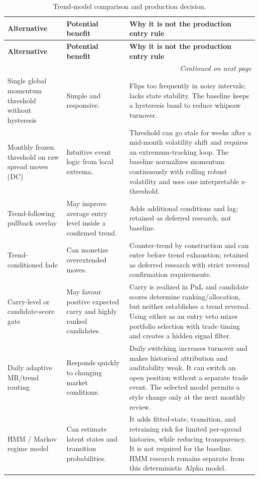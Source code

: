 {
\small
\setlength{\LTleft}{0pt}
\setlength{\LTright}{0pt}
\setlength{\tabcolsep}{5pt}
\renewcommand{\arraystretch}{1.15}
\begin{longtable}{p{} p{} p{}}
\caption{Trend-model comparison and production decision.}\label{tab:pairs-model-comparison-overleaf} \\
\toprule
\textbf{Alternative} & \textbf{Potential benefit} & \textbf{Why it is not the production entry rule} \\
\midrule
\endfirsthead
\toprule
\textbf{Alternative} & \textbf{Potential benefit} & \textbf{Why it is not the production entry rule} \\
\midrule
\endhead
\midrule
\multicolumn{3}{r}{\textit{Continued on next page}} \\
\midrule
\endfoot
\bottomrule
\endlastfoot
Single global momentum threshold without hysteresis & Simple and responsive. & Flips too frequently in noisy intervals; lacks state stability. The baseline keeps a hysteresis band to reduce whipsaw turnover. \\
Monthly frozen threshold on raw spread moves (DC) & Intuitive event logic from local extrema. & Threshold can go stale for weeks after a mid-month volatility shift and requires an extremum-tracking loop. The baseline normalizes momentum continuously with rolling robust volatility and uses one interpretable z-threshold. \\
Trend-following pullback overlay & May improve average entry level inside a confirmed trend. & Adds additional conditions and lag; retained as deferred research, not baseline. \\
Trend-conditioned fade & Can monetize overextended moves. & Counter-trend by construction and can enter before trend exhaustion; retained as deferred research with strict reversal confirmation requirements. \\
Carry-level or candidate-score gate & May favour positive expected carry and highly ranked candidates. & Carry is realized in PnL and candidate scores determine ranking/allocation, but neither establishes a trend reversal. Using either as an entry veto mixes portfolio selection with trade timing and creates a hidden signal filter. \\
Daily adaptive MR/trend routing & Responds quickly to changing market conditions. & Daily switching increases turnover and makes historical attribution and auditability weak. It can switch an open position without a separate trade event. The selected model permits a style change only at the next monthly review. \\
HMM / Markov regime model & Can estimate latent states and transition probabilities. & It adds fitted-state, transition, and retraining risk for limited per-spread histories, while reducing transparency. It is not required for the baseline. HMM research remains separate from this deterministic Alpha model. \\
\end{longtable}
}

